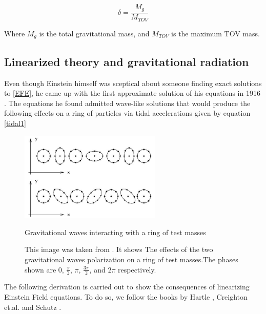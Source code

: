 \begin{equation}\label{delta}
\delta=\frac{M_g}{M_{TOV}}
\end{equation} 

Where $M_g$ is the total gravitational mass, and $M_{TOV}$ is the maximum TOV mass.




\subsection{Linearized theory and gravitational radiation}\label{GW}

Even though Einstein himself was sceptical about someone finding  exact solutions to \ref{EFE}, he came up with the first approximate solution of his equations in 1916 \cite{Einstein:1916cc}. The equations he found admitted wave-like solutions that would produce the following effects on a ring of particles via tidal accelerations given by equation \ref{tidal1}


\begin{figure}[hbt!]
\begin{center}
\includegraphics[width=0.6\textwidth, angle=0]{images/particle-ring.png}
\captionsetup{width=0.8\textwidth}
\caption{Gravitational waves interacting with a ring of test masses}
\caption*{This image was taken from \cite{carroll-notes}.  It shows The effects of the two gravitational waves polarization on a ring of test masses.The phases shown are 0, $\frac{\pi}{2}$, $\pi$, $\frac{3\pi}{2}$, and $2\pi$ respectively.
}
\label{GW passing through a ring of test masses}
\end{center}
\end{figure}

\FloatBarrier

The following derivation is carried out to show the consequences of linearizing Einstein Field equations. To do so, we follow the books by Hartle \cite{Hartle:2021pel}, Creighton et.al. \cite{Creighton:2011zz} and Schutz \cite{Schutz:1985jx}. 

